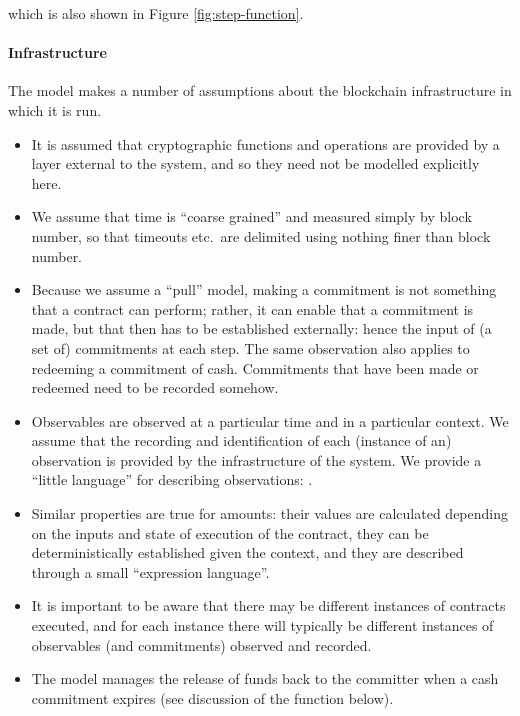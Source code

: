\documentclass[
      acmsmall
    , screen
    , review=true
  ]{acmart}
\begin{document}
which is also shown in Figure \ref{fig:step-function}.

\paragraph{Infrastructure}

The model makes a number of assumptions about the blockchain infrastructure in which it is run.

\begin{itemize}
\item It is assumed that cryptographic functions and operations are provided by a layer external to the system, and so they need not be modelled explicitly here.
\item We assume that time is ``coarse grained'' and measured simply by block number, so that timeouts etc.\ are delimited using nothing finer than block number. 
\item Because we assume a ``pull'' model, making a commitment is not something that a contract can perform; rather, it can enable that a commitment is made, but that then has to be established externally: hence the input of (a set of) commitments at each step. The same observation also applies to redeeming a commitment of cash. Commitments that have been made or redeemed need to be recorded somehow.

\item Observables are observed at a particular time and in a particular context. We assume that the recording and 
identification of each (instance of an) observation is provided by the infrastructure of the system. We provide a 
``little language'' for describing observations: . 
\item
Similar properties are true for
 amounts: their values are calculated depending on the inputs and state of execution of the 
contract, they can be deterministically established given the context, and they are described through a small 
``expression language''.
\item It is important to be aware that there may be different instances of contracts executed, and for each instance there will typically be different instances of observables (and commitments) observed and recorded.
\item The model manages the release of funds back to the committer when a cash commitment expires (see discussion of the  function below).
\end{itemize}
\end{document}
